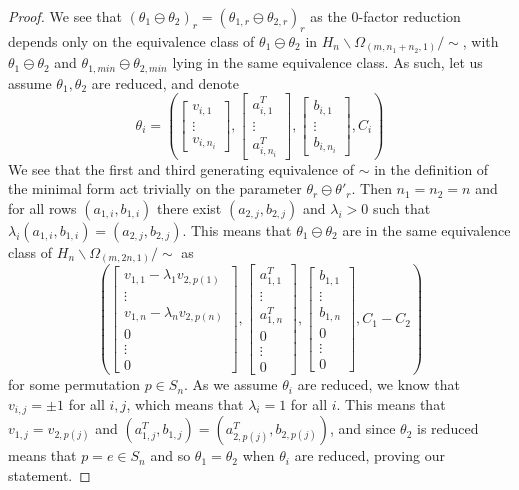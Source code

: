 \documentclass[11pt,letterpaper]{amsart}
\begin{document}
\begin{proof}
    \par We see that $(\theta_1\ominus \theta_2)_r  = (\theta_{1, r}\ominus \theta_{2, r})_r $ as the 0-factor reduction depends only on the equivalence class of $\theta_1\ominus \theta_2$ in $H_n\backslash \Omega_{(m, n_1+n_2, 1)}/\sim$, with $\theta_1\ominus \theta_2$ and $\theta_{1, min}\ominus \theta_{2, min}$ lying in the same equivalence class. As such, let us assume $\theta_1, \theta_2$ are reduced, and denote
    $$
    \theta_i = \left(\begin{bmatrix}
        v_{i, 1} \\ \vdots \\ v_{i,n_i}
    \end{bmatrix}, \begin{bmatrix}
        a_{i, 1}^T \\ \vdots \\ a_{i,n_i}^T
    \end{bmatrix}, \begin{bmatrix}
        b_{i,1} \\ \vdots \\ b_{i,n_i}
    \end{bmatrix}, C_i\right)
    $$
    We see that the first and third generating equivalence of $\sim$ in the definition of the minimal form act trivially on the parameter $\theta_r\ominus \theta'_r$. Then $n_1=n_2=n$ and for all rows $(a_{1, i}, b_{1, i})$ there exist $(a_{2, j}, b_{2, j})$ and $\lambda_{i}>0$ such that $\lambda_i (a_{1, i}, b_{1, i})= (a_{2, j}, b_{2, j})$. This means that $\theta_1\ominus\theta_2$ are in the same equivalence class of $H_n\backslash \Omega_{(m, 2n, 1)}/\sim$ as
    $$
    \left(\begin{bmatrix}
        v_{1, 1}-\lambda_{1}v_{2, p(1)} \\ \vdots \\ v_{1, n}-\lambda_{n}v_{2, p(n)} \\ 0 \\ \vdots \\ 0
    \end{bmatrix}, \begin{bmatrix}
        a_{1, 1}^T \\ \vdots \\ a_{1,n}^T \\ 0 \\ \vdots \\ 0
    \end{bmatrix}, \begin{bmatrix}
        b_{1,1} \\ \vdots \\ b_{1,n} \\ 0 \\ \vdots \\ 0
    \end{bmatrix}, C_1-C_2\right)
    $$
    for some permutation $p\in S_n$. As we assume $\theta_i$ are reduced, we know that $v_{i, j}=\pm 1$ for all $i, j$, which means that $\lambda_i = 1$ for all $i$. This means that $v_{1, j}=v_{2, p(j)}$ and $(a^T_{1, j}, b_{1, j})= (a^T_{2, p(j)}, b_{2, p(j)})$, and since $\theta_2$ is reduced means that $p=e\in S_n$ and so $\theta_1=\theta_2$ when $\theta_i$ are reduced, proving our statement. 
\end{proof}
\end{document}
